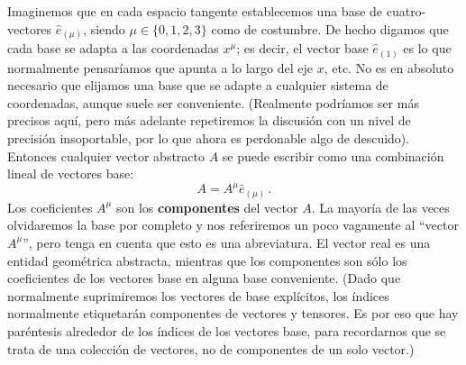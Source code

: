 \documentclass[11pt,b5paper,openany,twoside]{book}
\newcommand{\e}[1]{\hat{e}_{(#1)}}
\begin{document}
Imaginemos que en cada espacio tangente establecemos una base de cuatro-vectores $\e\mu$, siendo $\mu\in\{0,1,2,3\}$ como de costumbre.
De hecho digamos que cada base se adapta a las coordenadas $x^\mu$; es decir, el vector base $\e1$ es lo que normalmente pensaríamos que apunta a lo largo del eje $x$, etc.
No es en absoluto necesario que elijamos una base que se adapte a cualquier sistema de coordenadas, aunque suele ser conveniente.
(Realmente podríamos ser más precisos aquí, pero más adelante repetiremos la discusión con un nivel de precisión insoportable, por lo que ahora es perdonable algo de descuido).
Entonces cualquier vector abstracto $A$ se puede escribir como una combinación lineal de vectores base:
\begin{equation}
A = A^\mu \e\mu\,.\label{1.23}
\end{equation}
Los coeficientes $A^\mu$ son los {\bf componentes} del vector $A$.
La mayoría de las veces olvidaremos la base por completo y nos referiremos un poco vagamente al ``vector $A^\mu$'', pero tenga en cuenta que esto es una abreviatura.
El vector real es una entidad geométrica abstracta, mientras que los componentes son sólo los coeficientes de los vectores base en alguna base conveniente.
(Dado que normalmente suprimiremos los vectores de base explícitos, los índices normalmente etiquetarán componentes de vectores y tensores.
Es por eso que hay paréntesis alrededor de los índices de los vectores base, para recordarnos que se trata de una colección de vectores, no de componentes de un solo vector.)
\end{document}
